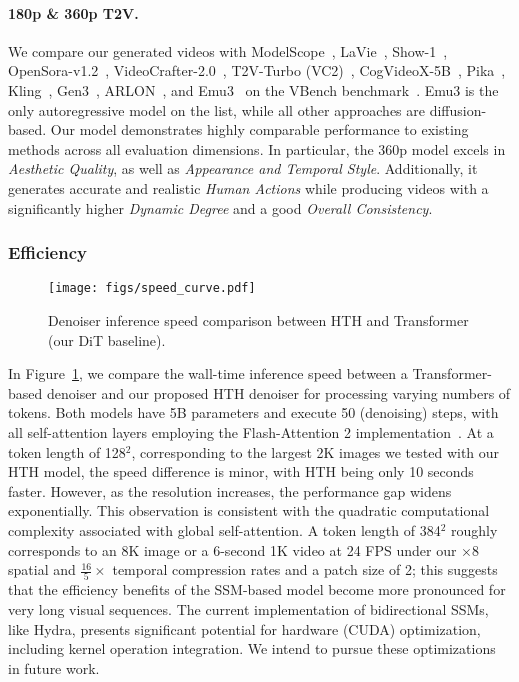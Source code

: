 \paragraph{180p \& 360p T2V.} We compare our generated videos with ModelScope~\citep{wang2023modelscope}, LaVie~\citep{wang2023lavie}, Show-1~\citep{zhang2024show1}, OpenSora-v1.2~\citep{opensora2024v1p2}, VideoCrafter-2.0~\citep{chen2023videocrafter1}, T2V-Turbo (VC2)~\citep{li2024t2vturbo}, CogVideoX-5B~\citep{yang2024cogvideox}, Pika~\citep{pika2023}, Kling~\citep{kling2024}, Gen3~\citep{gen3_2024}, ARLON~\citep{li2024arlon}, and Emu3~\citep{wang2024emu3} on the VBench benchmark~\citep{huang2024vbench}. Emu3 is the only autoregressive model on the list, while all other approaches are diffusion-based. Our \ours{} model demonstrates highly comparable performance to existing methods across all evaluation dimensions. In particular, the 360p model excels in \textit{Aesthetic Quality}, as well as \textit{Appearance and Temporal Style}. Additionally, it generates accurate and realistic \textit{Human Actions} while producing videos with a significantly higher \textit{Dynamic Degree} and a good \textit{Overall Consistency}.


\subsubsection{Efficiency}

\begin{figure}[t]
  \centering
  \texttt{[image: figs/speed\_curve.pdf]}
  \vspace{-7pt}
  \caption{Denoiser inference speed comparison between HTH and Transformer (our DiT baseline).}
  \label{fig:speed_curve}
  \vspace{-10pt}
\end{figure}

In Figure~\ref{fig:speed_curve}, we compare the wall-time inference speed between a Transformer-based denoiser and our proposed HTH denoiser for processing varying numbers of tokens. Both models have 5B parameters and execute 50 (denoising) steps, with all self-attention layers employing the Flash-Attention 2 implementation~\citep{dao2023flashattention2}.
At a token length of 128$^{2}$, corresponding to the largest 2K images we tested with our HTH model, the speed difference is minor, with HTH being only 10 seconds faster. However, as the resolution increases, the performance gap widens exponentially. This observation is consistent with the quadratic computational complexity associated with global self-attention. A token length of 384$^{2}$ roughly corresponds to an 8K image or a 6-second 1K video at 24 FPS under our $\times$8 spatial and $\frac{16}{5}\times$ temporal compression rates and a patch size of 2; this suggests that the efficiency benefits of the SSM-based model become more pronounced for very long visual sequences.
The current implementation of bidirectional SSMs, like Hydra, presents significant potential for hardware (CUDA) optimization, including kernel operation integration. We intend to pursue these optimizations in future work.

